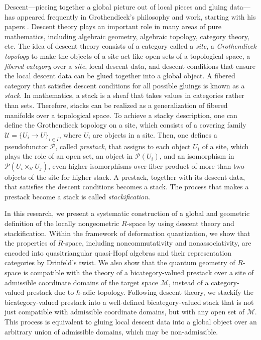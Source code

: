 \documentclass[reqno]{amsart}
\theoremstyle{definition}
\theoremstyle{remark}
\begin{document}
    Descent—piecing together a global picture out of local pieces and gluing data—has appeared frequently in Grothendieck's philosophy and work, starting with his papers \cite{GrothendieckBourbakiDescent}. Descent theory plays an important role in many areas of pure mathematics, including algebraic geometry, algebraic topology, category theory, etc. The idea of descent theory consists of a category called a \textit{site}, a \textit{Grothendieck topology} to make the objects of a site act like open sets of a topological space, a \textit{fibered category} over a \textit{site}, local descent data, and descent conditions that ensure the local descent data can be glued together into a global object. A fibered category that satisfies descent conditions for all possible gluings is known as a \textit{stack}. In mathematics, a stack is a sheaf that takes values in categories rather than sets. Therefore, stacks can be realized as a generalization of fibered manifolds over a topological space. To achieve a stacky description, one can define the Grothendieck topology on a site, which consists of a covering family $\mathcal{U}=\{U_i\longrightarrow U\}_{i\in I}$, where $U_i$ are objects in a site. Then, one defines a pseudofunctor $\mathscr{P}$, called \textit{prestack}, that assigns to each object $U_i$ of a site, which plays the role of an open set, an object in $\mathscr{P}(U_i)$, and an isomorphism in $\mathscr{P}(U_i \times_\mathcal{U} U_j)$, even higher isomorphisms over fiber product of more than two objects of the site for higher stack. A prestack, together with its descent data, that satisfies the descent conditions becomes a stack. The process that makes a prestack become a stack is called \textit{stackification}. 

    In this research, we present a systematic construction of a global and geometric definition of the locally nongeometric $R$-space by using descent theory and stackification. Within the framework of deformation quantization, we show that the properties of $R$-space, including noncommutativity and nonassociativity, are encoded into quasitriangular quasi-Hopf algebras and their representation categories by Drinfeld's twist. We also show that the quantum geometry of $R$-space is compatible with the theory of a bicategory-valued prestack over a site of admissible coordinate domains of the target space $\mathcal{M}$, instead of a category-valued prestack due to $\hbar$-adic topology. Following descent theory, we stackify the bicategory-valued prestack into a well-defined bicategory-valued stack that is not just compatible with admissible coordinate domains, but with any open set of $\mathcal{M}$. This process is equivalent to gluing local descent data into a global object over an arbitrary union of admissible domains, which may be non-admissible. 
\end{document}
